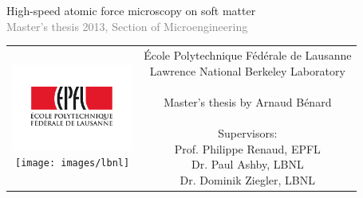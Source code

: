 \begin{titlepage}
\begin{center}
\sffamily


\null\vspace{2cm}
{\huge High-speed atomic force microscopy on soft matter}
\\
\textcolor{gray}{Master's thesis 2013, Section of Microengineering}

    
\vfill

\begin{tabular} {cc}
\parbox{0.3\textwidth}{
	\includegraphics[width=4cm]{images/epfl}\\ 
	\texttt{[image: images/lbnl]}}
&
\parbox{0.7\textwidth}{
	École Polytechnique Fédérale de Lausanne\\
	Lawrence National Berkeley Laboratory\\ \\
	Master's thesis by Arnaud Bénard\\
	\\
	Supervisors:\\
	    Prof. Philippe Renaud, EPFL\\
	    Dr. Paul Ashby, LBNL\\
	    Dr. Dominik Ziegler, LBNL\\[12pt]
}
\end{tabular}

\end{center}
\vspace{2cm}
\end{titlepage}